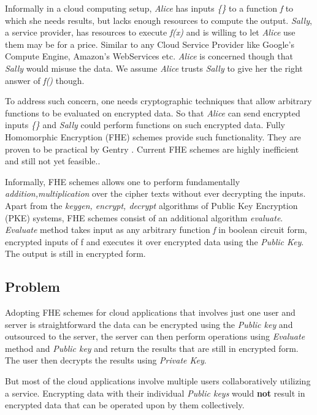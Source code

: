 \documentclass[conference]{IEEEtran}
\numberwithin{equation}{section}
\begin{document}
Informally in a cloud computing setup, \emph{Alice} has inputs \emph{\{\}} to a function \emph{f} to which she needs results, but lacks enough resources to compute the output. \emph{Sally}, a service provider, has resources to execute \emph{f(x)} and is willing to let \emph{Alice} use them may be for a price. Similar to any Cloud Service Provider like Google's Compute Engine, Amazon's WebServices  etc. \emph{Alice} is concerned though that \emph{Sally} would misuse the data. We assume \emph{Alice} trusts \emph{Sally}  to give her the right answer of \emph{f()} though.

To address such concern, one needs cryptographic techniques that allow arbitrary functions to be evaluated on encrypted data. So that \emph{Alice} can send encrypted inputs  \emph{\{\}} and \emph{Sally} could perform functions on such encrypted data. Fully Homomorphic Encryption (FHE) schemes provide such functionality. They are proven to be practical by Gentry \cite{gentry2009fully}. Current FHE schemes are highly inefficient and still not yet feasible.\cite{vaikuntanathan2011computing}.

Informally, FHE schemes allows one to perform fundamentally \emph{addition,multiplication} over the cipher texts without ever decrypting the inputs. Apart from the \emph{keygen, encrypt, decrypt} algorithms of Public Key Encryption (PKE) systems, FHE schemes consist of an additional algorithm \emph{evaluate}. \emph{Evaluate} method takes input as any arbitrary function \emph{f} in boolean circuit form, encrypted inputs of {f} and executes it over encrypted data using the \emph{Public Key}. The output is still in encrypted form. 



\subsection{Problem}
Adopting FHE schemes for cloud applications that involves just one user and server is straightforward the data can be encrypted using the \emph{Public key} and outsourced to the server, the server can then perform operations using \emph{Evaluate} method and \emph{Public key} and return the results that are still in encrypted form. The user then decrypts the results using \emph{Private Key}. 

But most of the cloud applications involve multiple users collaboratively utilizing a service.  Encrypting data with their individual \emph{Public keys} would {\bf not} result in encrypted data that can be operated upon by them collectively. 
\end{document}
